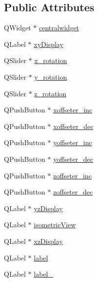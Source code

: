 \subsection*{Public Attributes}
\begin{DoxyCompactItemize}
\item 
Q\+Widget $\ast$ \hyperlink{classUi__MainWindow_a356f1cf3ebda15f1fac59467ee081b74}{centralwidget}
\item 
Q\+Label $\ast$ \hyperlink{classUi__MainWindow_a99921004e1a51529c85ef1e464ae1795}{xy\+Display}
\item 
Q\+Slider $\ast$ \hyperlink{classUi__MainWindow_ac6ffe5ad47f715bb1013b266bc8710c8}{x\+\_\+rotation}
\item 
Q\+Slider $\ast$ \hyperlink{classUi__MainWindow_a4fb5094bb0025227c76a518d26aaa92d}{y\+\_\+rotation}
\item 
Q\+Slider $\ast$ \hyperlink{classUi__MainWindow_a88fbf2ccdc3a516ab0c9a7a1c5b005c7}{z\+\_\+rotation}
\item 
Q\+Push\+Button $\ast$ \hyperlink{classUi__MainWindow_a1e4d1a63a517bb12acf5ed91f2659be0}{xoffseter\+\_\+inc}
\item 
Q\+Push\+Button $\ast$ \hyperlink{classUi__MainWindow_a3fda156197df65e2bb66d46b9fa92da7}{xoffseter\+\_\+dec}
\item 
Q\+Push\+Button $\ast$ \hyperlink{classUi__MainWindow_a46ac8d6feb02d6f1061babe4d14bdd17}{yoffseter\+\_\+inc}
\item 
Q\+Push\+Button $\ast$ \hyperlink{classUi__MainWindow_aa88503326f7e472a16cfb47916919ce2}{yoffseter\+\_\+dec}
\item 
Q\+Push\+Button $\ast$ \hyperlink{classUi__MainWindow_a5d0ff4709b25b67436a8c72c95d6ac27}{zoffseter\+\_\+inc}
\item 
Q\+Push\+Button $\ast$ \hyperlink{classUi__MainWindow_ab4b58c0395979679488e796e461543f6}{zoffseter\+\_\+dec}
\item 
Q\+Label $\ast$ \hyperlink{classUi__MainWindow_a3958ce0590bcb96665760a57244bec5b}{yz\+Display}
\item 
Q\+Label $\ast$ \hyperlink{classUi__MainWindow_a762edccde6f2642394b92dcf163831ce}{isometric\+View}
\item 
Q\+Label $\ast$ \hyperlink{classUi__MainWindow_a650abac16569aff8a31b898de36c8044}{xz\+Display}
\item 
Q\+Label $\ast$ \hyperlink{classUi__MainWindow_ad9c89133780f28e6efa2ec17ceb9cff5}{label}
\item 
Q\+Label $\ast$ \hyperlink{classUi__MainWindow_a2e2516d755e4dd53fc905dabddf2738a}{label\+\_}

\end{DoxyCompactItemize}

